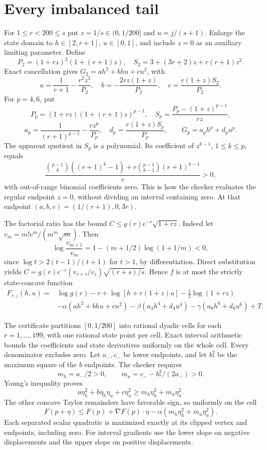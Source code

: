\documentclass[11pt]{article}
\begin{document}
\section{Every imbalanced tail}
For $1\le r<200\le s$ put $z=1/s\in(0,1/200]$ and $u=j/(s+1)$. Enlarge the state domain to $h\in[2,r+1]$, $u\in[0,1]$, and include $z=0$ as an auxiliary limiting parameter. Define
\[
 P_2=(1+rz)^2(1+(r+1)z),\quad
 S_2=3+(3r+2)z+r(r+1)z^2.
\]
Exact cancellation gives $G_2=ah^2+bhu+cu^2$, with
\[
 a=\frac1{r+1}-\frac{r^2z^3}{P_2},\quad
 b=-\frac{2rz(1+z)}{P_2},\quad c=\frac{r(1+z)S_2}{P_2}.
\]
For $p=4,6$, put
\[
 P_p=(1+rz)(1+(r+1)z)^{p-1},\quad
 S_p=\frac{P_p-(1+z)^{p-1}}{rz},
\]
\[
 a_p=\frac1{(r+1)^{p-1}}-\frac{rz^p}{P_p},\quad
 d_p=\frac{r(1+z)S_p}{P_p},\qquad G_p=a_ph^p+d_pu^p.
\]
The apparent quotient in $S_p$ is a polynomial. Its coefficient of $z^{k-1}$, $1\le k\le p$, equals
\[
 \frac{\binom{p-1}{k}((r+1)^k-1)+r\binom{p-1}{k-1}(r+1)^{k-1}}r>0,
\]
with out-of-range binomial coefficients zero. This is how the checker evaluates the regular endpoint $z=0$, without dividing an interval containing zero. At that endpoint $(a,b,c)=(1/(r+1),0,3r)$.

The factorial ratio has the bound $C\le g(r)e^{-r}\sqrt{1+rz}$. Indeed let $v_m=m!e^m/(m^m\sqrt m)$. Then
\[
 \log\frac{v_{m+1}}{v_m}=1-(m+1/2)\log(1+1/m)<0,
\]
since $\log t>2(t-1)/(t+1)$ for $t>1$, by differentiation. Direct substitution yields
$C=g(r)e^{-r}(v_{r+s}/v_s)\sqrt{(r+s)/s}$.
Hence $f$ is at most the strictly state-concave function
\begin{align*}
 F_{r,z}(h,u)={}&\log g(r)-r+\log[h+r(1+z)u]-\tfrac12\log(1+rz)\\
 &-\alpha(ah^2+bhu+cu^2)-\beta(a_4h^4+d_4u^4)
 -\gamma(a_6h^6+d_6u^6)+T.
\end{align*}

The certificate partitions $[0,1/200]$ into rational dyadic cells for each $r=1,\ldots,199$, with one rational state point per cell. Exact interval arithmetic bounds the coefficients and state derivatives uniformly on the whole cell. Every denominator excludes zero. Let $a_-,c_-$ be lower endpoints, and let $b_*^2$ be the maximum square of the $b$ endpoints. The checker requires
\[
 m_h=a_-/2>0,\qquad m_u=c_- -b_*^2/(2a_-)>0.
\]
Young's inequality proves
\[
 a\eta_h^2+b\eta_h\eta_u+c\eta_u^2\ge m_h\eta_h^2+m_u\eta_u^2.
\]
The other concave Taylor remainders have favorable sign, so uniformly on the cell
\[
 F(p+\eta)\le F(p)+\nabla F(p)\cdot\eta
                  -\alpha(m_h\eta_h^2+m_u\eta_u^2).
\]
Each separated scalar quadratic is maximized exactly at its clipped vertex and endpoints, including zero. For interval gradients use the lower slope on negative displacements and the upper slope on positive displacements.
\end{document}
